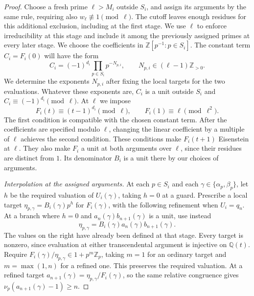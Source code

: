 \begin{proof}
    Choose a fresh prime $\ell > M_i$ outside $S_i$, and assign its arguments by the same rule, requiring also $w_\ell \not\equiv 1 \pmod{\ell}$.
    The cutoff leaves enough residues for this additional exclusion, including at the first stage.
    We use $\ell$ to enforce irreducibility at this stage and include it among the previously assigned primes at every later stage.
    We choose the coefficients in $\mathbb{Z}[p^{-1} : p \in S_i]$.
    The constant term $C_i = F_i(0)$ will have the form
    \begin{equation}
        \label{eq:raw-constant}
        C_i = (-1)^{d_i} \prod_{p \in S_i} p^{-N_{p, i}},
        \qquad N_{p, i} \in (\ell - 1)\mathbb{Z}_{> 0}.
    \end{equation}
    We determine the exponents $N_{p, i}$ after fixing the local targets for the two evaluations.
    Whatever these exponents are, $C_i$ is a unit outside $S_i$ and $C_i \equiv (-1)^{d_i} \pmod{\ell}$.
    At $\ell$ we impose
    \[
        F_i(t) \equiv (t - 1)^{d_i} \pmod{\ell},
        \qquad F_i(1) \equiv \ell \pmod{\ell^2}.
    \]
    The first condition is compatible with the chosen constant term.
    After the coefficients are specified modulo $\ell$, changing the linear coefficient by a multiple of $\ell$ achieves the second condition.
    These conditions make $F_i(t + 1)$ Eisenstein at $\ell$.
    They also make $F_i$ a unit at both arguments over $\ell$, since their residues are distinct from $1$.
    Its denominator $B_i$ is a unit there by our choices of arguments.

    \emph{Interpolation at the assigned arguments.}
    At each $p \in S_i$ and each $\gamma \in \{\alpha_p, \beta_p\}$, let $h$ be the required valuation of $U_i(\gamma)$, taking $h = 0$ at a guard.
    Prescribe a local target $\eta_{p, \gamma} = B_i(\gamma) p^h$ for $F_i(\gamma)$, with the following refinement when $U_i = q_n$.
    At a branch where $h = 0$ and $a_n(\gamma)b_{n + 1}(\gamma)$ is a unit, use instead
    \[
        \eta_{p, \gamma} = B_i(\gamma) a_n(\gamma) b_{n + 1}(\gamma).
    \]
    The values on the right have already been defined at that stage.
    Every target is nonzero, since evaluation at either transcendental argument is injective on $\mathbb{Q}(t)$.
    Require $F_i(\gamma)/\eta_{p, \gamma} \in 1 + p^m\mathbb{Z}_p$, taking $m = 1$ for an ordinary target and $m = \max(1, n)$ for a refined one.
    This preserves the required valuation.
    At a refined target $a_{n + 1}(\gamma) = \eta_{p, \gamma}/F_i(\gamma)$, so the same relative congruence gives $\nu_p(a_{n + 1}(\gamma) - 1) \ge n$.


\end{proof}
